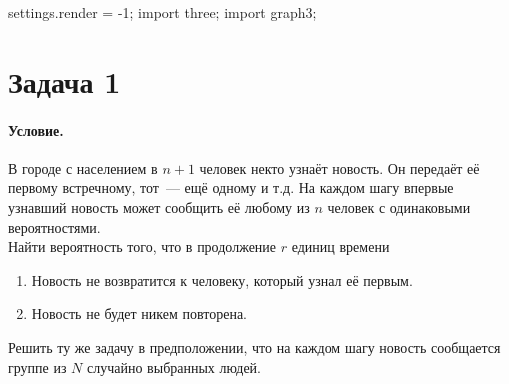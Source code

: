 \documentclass{article}
\begin{document}
    \begin{asydef}
        settings.render = -1;
        import three;
        import graph3;
    \end{asydef}
    \section{Задача 1}
    \paragraph{Условие.}
    В городе с населением в $n+1$ человек некто узнаёт новость. Он передаёт её первому встречному, тот~--- ещё одному и т.д. На каждом шагу впервые узнавший новость может сообщить её любому из $n$ человек  с одинаковыми вероятностями.\\
    Найти вероятность того, что в продолжение $r$ единиц времени
    \begin{enumerate}
        \item Новость не возвратится к человеку, который узнал её первым.
        \item Новость не будет никем повторена.
    \end{enumerate}
    Решить ту же задачу в предположении, что на каждом шагу новость сообщается группе из $N$ случайно выбранных людей.
\end{document}
